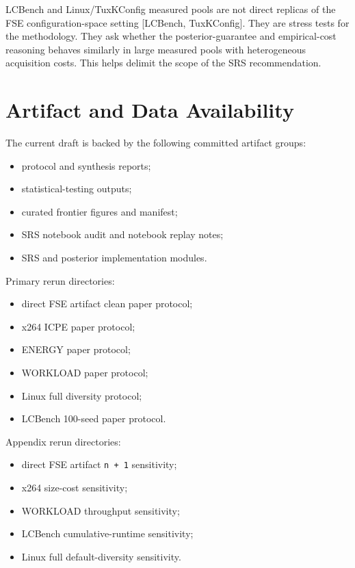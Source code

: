 \documentclass[smallcondensed]{svjour3}
\providecommand{\tightlist}{%
  \setlength{\itemsep}{0pt}\setlength{\parskip}{0pt}}
\begin{document}
LCBench and Linux/TuxKConfig measured pools are not direct replicas of
the FSE configuration-space setting {[}LCBench, TuxKConfig{]}. They are
stress tests for the methodology. They ask whether the
posterior-guarantee and empirical-cost reasoning behaves similarly in
large measured pools with heterogeneous acquisition costs. This helps
delimit the scope of the SRS recommendation.

\section{Artifact and Data
Availability}\label{artifact-and-data-availability}

The current draft is backed by the following committed artifact groups:

\begin{itemize}
\tightlist
\item
  protocol and synthesis reports;
\item
  statistical-testing outputs;
\item
  curated frontier figures and manifest;
\item
  SRS notebook audit and notebook replay notes;
\item
  SRS and posterior implementation modules.
\end{itemize}

Primary rerun directories:

\begin{itemize}
\tightlist
\item
  direct FSE artifact clean paper protocol;
\item
  x264 ICPE paper protocol;
\item
  ENERGY paper protocol;
\item
  WORKLOAD paper protocol;
\item
  Linux full diversity protocol;
\item
  LCBench 100-seed paper protocol.
\end{itemize}

Appendix rerun directories:

\begin{itemize}
\tightlist
\item
  direct FSE artifact \texttt{n\ +\ 1} sensitivity;
\item
  x264 size-cost sensitivity;
\item
  WORKLOAD throughput sensitivity;
\item
  LCBench cumulative-runtime sensitivity;
\item
  Linux full default-diversity sensitivity.
\end{itemize}
\end{document}
